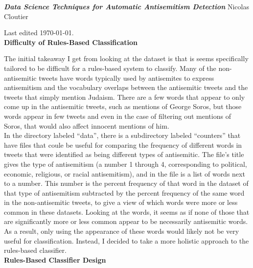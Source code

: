 \documentclass{article}
\begin{document}
{\bf \emph{Data Science Techniques for Automatic Antisemitism Detection}} \hfill Nicolas Cloutier

Last edited \today.\\

{\bf Difficulty of Rules-Based Classification}

The initial takeaway I get from looking at the dataset is that is seems specifically tailored to be difficult for a rules-based system to classify. Many of the non-antisemitic tweets have words typically used by antisemites to express antisemitism and the vocabulary overlaps between the antisemitic tweets and the tweets that simply mention Judaism. There are a few words that appear to only come up in the antisemitic tweets, such as mentions of George Soros, but those words appear in few tweets and even in the case of filtering out mentions of Soros, that would also affect innocent mentions of him. \\

In the directory labeled ``data'', there is a subdirectory labeled ``counters'' that have files that coule be useful for comparing the frequency of different words in tweets that were identified as being different types of antisemitic. The file's title gives the type of antisemitism (a number 1 through 4, corresponding to political, economic, religious, or racial antisemitism), and in the file is a list of words next to a number. This number is the percent frequency of that word in the dataset of that type of antisemitism subtracted by the percent frequency of the same word in the non-antisemitic tweets, to give a view of which words were more or less common in these datasets. Looking at the words, it seems as if none of those that are significantly more or less common appear to be necessarily antisemitic words. As a result, only using the appearance of these words would likely not be very useful for classification. Instead, I decided to take a more holistic approach to the rules-based classifier. \\

{\bf Rules-Based Classifier Design}
\end{document}
